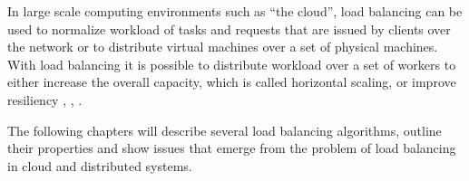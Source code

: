 In large scale computing environments such as ``the cloud'', load balancing can
be used to normalize workload of tasks and requests that are issued by
clients over the network \cite{alakeel2010guide} or to distribute virtual
machines over a set of physical machines.
With load balancing it is possible to distribute workload over a set of workers
to either increase the overall capacity, which is called horizontal scaling,
or improve resiliency \cite{areYouLoadBalancingWrong}, \cite{aTaxonomyAndSurv},
\cite{cloudLBTech}.

The following chapters will describe several load balancing algorithms, outline
their properties and show issues that emerge from the problem of load
balancing in cloud and distributed systems.

